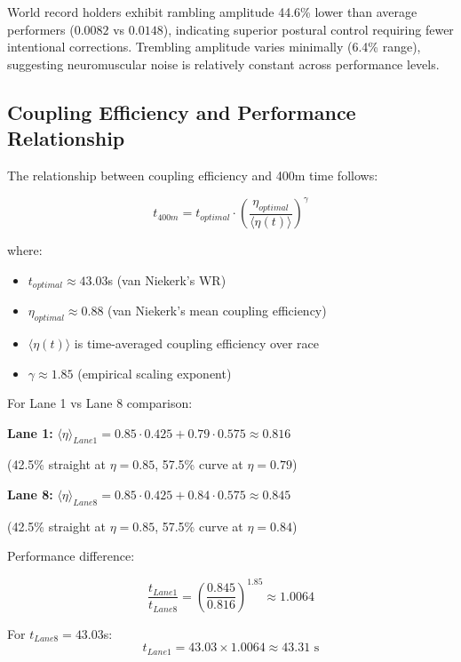World record holders exhibit rambling amplitude 44.6\% lower than average performers ($0.0082$ vs $0.0148$), indicating superior postural control requiring fewer intentional corrections. Trembling amplitude varies minimally (6.4\% range), suggesting neuromuscular noise is relatively constant across performance levels.

\subsection{Coupling Efficiency and Performance Relationship}

The relationship between coupling efficiency and 400m time follows:

\begin{equation}
t_{400m} = t_{optimal} \cdot \left(\frac{\eta_{optimal}}{\langle \eta(t) \rangle}\right)^{\gamma}
\end{equation}

where:
\begin{itemize}
    \item $t_{optimal} \approx 43.03$s (van Niekerk's WR)
    \item $\eta_{optimal} \approx 0.88$ (van Niekerk's mean coupling efficiency)
    \item $\langle \eta(t) \rangle$ is time-averaged coupling efficiency over race
    \item $\gamma \approx 1.85$ (empirical scaling exponent)
\end{itemize}

For Lane 1 vs Lane 8 comparison:

\textbf{Lane 1:} $\langle \eta \rangle_{Lane1} = 0.85 \cdot 0.425 + 0.79 \cdot 0.575 \approx 0.816$

(42.5\% straight at $\eta = 0.85$, 57.5\% curve at $\eta = 0.79$)

\textbf{Lane 8:} $\langle \eta \rangle_{Lane8} = 0.85 \cdot 0.425 + 0.84 \cdot 0.575 \approx 0.845$

(42.5\% straight at $\eta = 0.85$, 57.5\% curve at $\eta = 0.84$)

Performance difference:

\begin{equation}
\frac{t_{Lane1}}{t_{Lane8}} = \left(\frac{0.845}{0.816}\right)^{1.85} \approx 1.0064
\end{equation}

For $t_{Lane8} = 43.03$s:
\begin{equation}
t_{Lane1} = 43.03 \times 1.0064 \approx 43.31 \text{ s}
\end{equation}

